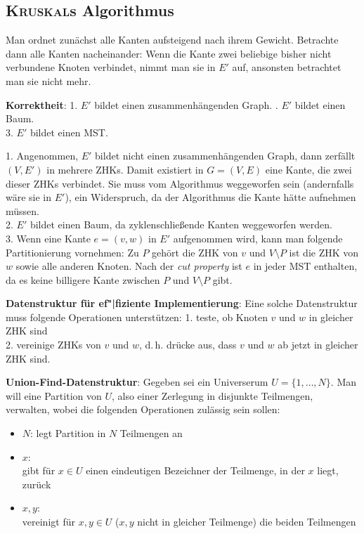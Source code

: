 \subsection{%
    \textsc{Kruskal}s Algorithmus%
}

Man ordnet zunächst alle Kanten aufsteigend nach ihrem Gewicht.
Betrachte dann alle Kanten nacheinander:
Wenn die Kante zwei beliebige bisher nicht verbundene Knoten verbindet,
nimmt man sie in $E'$ auf, ansonsten betrachtet man sie nicht mehr.

\linie

\textbf{Korrektheit}:
1. $E'$ bildet einen zusammenhängenden Graph. . $E'$ bildet einen Baum. \\
3. $E'$ bildet einen MST.

\begin{Beweis}
    1. Angenommen, $E'$ bildet nicht einen zusammenhängenden Graph,
    dann zerfällt $(V, E')$ in mehrere ZHKs.
    Damit existiert in $G = (V, E)$ eine Kante, die zwei dieser ZHKs verbindet.
    Sie muss vom Algorithmus weggeworfen sein (andernfalls wäre sie in $E'$),
    ein Widerspruch, da der Algorithmus die Kante hätte aufnehmen müssen. \\
    2. $E'$ bildet einen Baum, da zyklenschließende Kanten weggeworfen
    werden. \\
    3. Wenn eine Kante $e = (v, w)$ in $E'$ aufgenommen wird, kann man folgende
    Partitionierung vornehmen:
    Zu $P$ gehört die ZHK von $v$ und $V \setminus P$ ist die ZHK von $w$
    sowie alle anderen Knoten.
    Nach der \emph{cut property} ist $e$ in jeder MST enthalten, da es keine
    billigere Kante zwischen $P$ und $V \setminus P$ gibt.
\end{Beweis}

\linie

\textbf{Datenstruktur für ef"|fiziente Implementierung}:
Eine solche Datenstruktur muss folgende Operationen unterstützen:
1. teste, ob Knoten $v$ und $w$ in gleicher ZHK sind \\
2. vereinige ZHKs von $v$ und $w$,
d.\,h. drücke aus, dass $v$ und $w$ ab jetzt in gleicher ZHK sind.

\textbf{Union-Find-Datenstruktur}:
Gegeben sei ein Universerum $U = \{1, \dotsc, N\}$.
Man will eine Partition von $U$, also einer Zerlegung in disjunkte Teilmengen,
verwalten, wobei die folgenden Operationen zulässig sein sollen:
\begin{itemize}
    \item
    \textbf{$N$\code{)}}:
    legt Partition in $N$ Teilmengen an

    \item
    \textbf{$x$\code{)}}: \\
    gibt für $x \in U$ einen eindeutigen Bezeichner der Teilmenge, in der
    $x$ liegt, zurück

    \item
    \textbf{$x, y$\code{)}}: \\
    vereinigt für $x, y \in U$ ($x, y$ nicht in gleicher Teilmenge)
    die beiden Teilmengen
\end{itemize}

